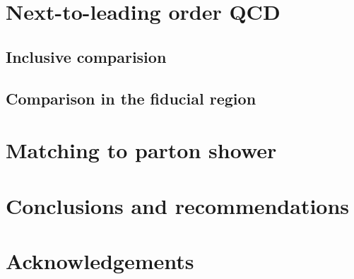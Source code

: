 \documentclass[twocolumn,epjc3]{svjour3} %
\begin{document}
\section{Next-to-leading order QCD}
    \label{sec:NLO}
    \subsection{Inclusive comparision}
        \label{subsec:NLOinclusive}
        
    \subsection{Comparison in the fiducial region}
    \label{sec:fidNLO}
        
        

\section{Matching to parton shower}
    \label{sec:matching}
    


\section{Conclusions and recommendations}
\label{sec:conclusion}




\section*{Acknowledgements}





\end{document}
